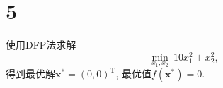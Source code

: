 \section*{5}

使用DFP法求解
\begin{equation*}
    \min_{x_1,x_2} ~ 10x_1^2+x_2^2,
\end{equation*}
得到最优解$\bm{x}^*=(0,0)^\mathrm{T}$, 最优值$f(\bm{x}^*)=0$.
